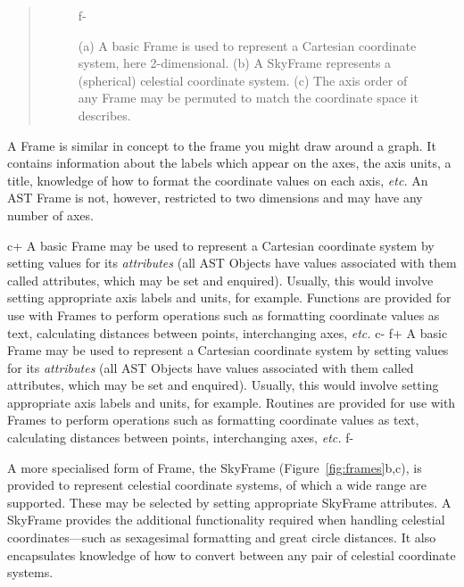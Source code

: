 \documentclass[twoside,11pt]{article}
\begin{document}
\begin{htmlonly}
\begin{quote}
\begin{figure}
f-
   \caption{(a) A basic Frame is used to represent a Cartesian coordinate
   system, here 2-dimensional. (b) A SkyFrame represents a (spherical)
   celestial coordinate system. (c) The axis order of any Frame may be
   permuted to match the coordinate space it describes.}
   \end{figure}
   \end{quote}
\end{htmlonly}
A Frame is similar in concept to the frame you might draw around a
graph.  It contains information about the labels which appear on the
axes, the axis units, a title, knowledge of how to format the
coordinate values on each axis, {\em{etc.}}  An AST Frame is not,
however, restricted to two dimensions and may have any number of axes.

c+
A basic Frame may be used to represent a Cartesian coordinate system
by setting values for its {\em attributes} (all AST Objects have
values associated with them called attributes, which may be set and
enquired).  Usually, this would involve setting appropriate axis
labels and units, for example.  Functions are provided for use with
Frames to perform operations such as formatting coordinate values as
text, calculating distances between points, interchanging axes,
{\em{etc.}}
c-
f+
A basic Frame may be used to represent a Cartesian coordinate system
by setting values for its {\em attributes} (all AST Objects have
values associated with them called attributes, which may be set and
enquired).  Usually, this would involve setting appropriate axis
labels and units, for example.  Routines are provided for use with
Frames to perform operations such as formatting coordinate values as
text, calculating distances between points, interchanging axes,
{\em{etc.}}
f-

A more specialised form of Frame, the SkyFrame
(Figure~\ref{fig:frames}b,c), is provided to represent celestial
coordinate systems, of which a wide range are supported.  These may be
selected by setting appropriate SkyFrame attributes.  A SkyFrame
provides the additional functionality required when handling celestial
coordinates---such as sexagesimal formatting and great circle
distances.  It also encapsulates knowledge of how to convert between
any pair of celestial coordinate systems.
\end{document}
